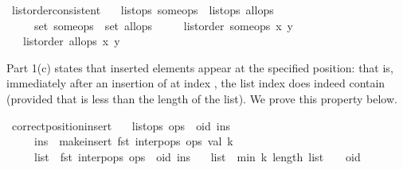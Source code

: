 \begin{isabelle}
\isamarkupfalse%
\ list{\isacharunderscore}order{\isacharunderscore}consistent{\isacharcolon}\isanewline
\ \ \ {\isachardoublequoteopen}list{\isacharunderscore}ops\ some{\isacharunderscore}ops{\isachardoublequoteclose}\ \ {\isachardoublequoteopen}list{\isacharunderscore}ops\ all{\isacharunderscore}ops{\isachardoublequoteclose}\isanewline
\ \ \ \ \ {\isachardoublequoteopen}set\ some{\isacharunderscore}ops\ {\isasymsubseteq}\ set\ all{\isacharunderscore}ops{\isachardoublequoteclose}\isanewline
\ \ \ \ \ {\isachardoublequoteopen}list{\isacharunderscore}order\ some{\isacharunderscore}ops\ x\ y{\isachardoublequoteclose}\isanewline
\ \ \ {\isachardoublequoteopen}list{\isacharunderscore}order\ all{\isacharunderscore}ops\ x\ y{\isachardoublequoteclose}
\end{isabelle}

Part 1(c) states that inserted elements appear at the specified position: that is, immediately after an insertion of  at index , the list index  does indeed contain  (provided that  is less than the length of the list).
We prove this property below.

\begin{isabelle}
\isamarkupfalse%
\ correct{\isacharunderscore}position{\isacharunderscore}insert{\isacharcolon}\isanewline
\ \ \ {\isachardoublequoteopen}list{\isacharunderscore}ops\ {\isacharparenleft}ops\ {\isacharat}\ {\isacharbrackleft}{\isacharparenleft}oid{\isacharcomma}\ ins{\isacharparenright}{\isacharbrackright}{\isacharparenright}{\isachardoublequoteclose}\isanewline
\ \ \ \ \ {\isachardoublequoteopen}ins\ {\isacharequal}\ make{\isacharunderscore}insert\ {\isacharparenleft}fst\ {\isacharparenleft}interp{\isacharunderscore}ops\ ops{\isacharparenright}{\isacharparenright}\ val\ k{\isachardoublequoteclose}\isanewline
\ \ \ \ \ {\isachardoublequoteopen}list\ {\isacharequal}\ fst\ {\isacharparenleft}interp{\isacharunderscore}ops\ {\isacharparenleft}ops\ {\isacharat}\ {\isacharbrackleft}{\isacharparenleft}oid{\isacharcomma}\ ins{\isacharparenright}{\isacharbrackright}{\isacharparenright}{\isacharparenright}{\isachardoublequoteclose}\isanewline
\ \ \ {\isachardoublequoteopen}list\ {\isacharbang}\ {\isacharparenleft}min\ k\ {\isacharparenleft}length\ list\ {\isacharminus}\ {}{\isacharparenright}{\isacharparenright}\ {\isacharequal}\ oid{\isachardoublequoteclose}
\end{isabelle}

